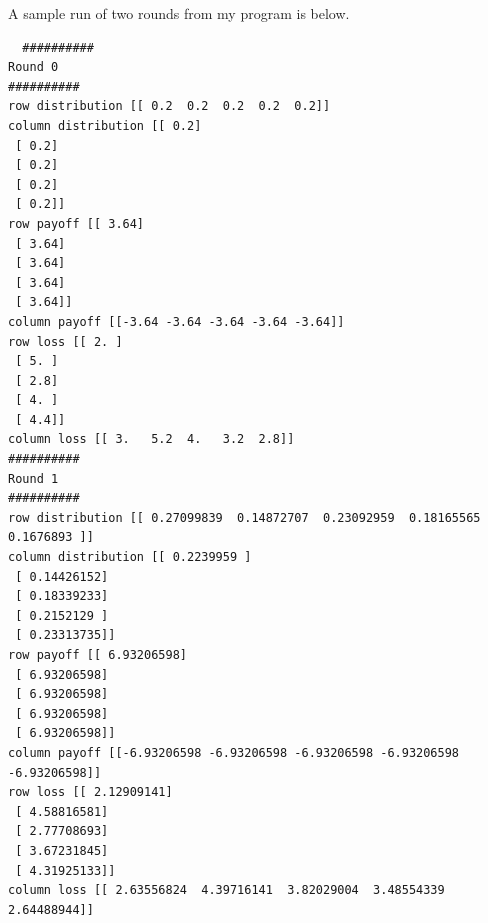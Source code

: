 \documentclass[12pt]{article}
\begin{document}
\begin{enumerate}
  A sample run of two rounds from my program is below.
  \scriptsize
  \begin{verbatim}
  ##########
Round 0
##########
row distribution [[ 0.2  0.2  0.2  0.2  0.2]]
column distribution [[ 0.2]
 [ 0.2]
 [ 0.2]
 [ 0.2]
 [ 0.2]]
row payoff [[ 3.64]
 [ 3.64]
 [ 3.64]
 [ 3.64]
 [ 3.64]]
column payoff [[-3.64 -3.64 -3.64 -3.64 -3.64]]
row loss [[ 2. ]
 [ 5. ]
 [ 2.8]
 [ 4. ]
 [ 4.4]]
column loss [[ 3.   5.2  4.   3.2  2.8]]
##########
Round 1
##########
row distribution [[ 0.27099839  0.14872707  0.23092959  0.18165565  0.1676893 ]]
column distribution [[ 0.2239959 ]
 [ 0.14426152]
 [ 0.18339233]
 [ 0.2152129 ]
 [ 0.23313735]]
row payoff [[ 6.93206598]
 [ 6.93206598]
 [ 6.93206598]
 [ 6.93206598]
 [ 6.93206598]]
column payoff [[-6.93206598 -6.93206598 -6.93206598 -6.93206598 -6.93206598]]
row loss [[ 2.12909141]
 [ 4.58816581]
 [ 2.77708693]
 [ 3.67231845]
 [ 4.31925133]]
column loss [[ 2.63556824  4.39716141  3.82029004  3.48554339  2.64488944]]
  \end{verbatim}
  \normalsize
    
\end{enumerate}
\end{document}
